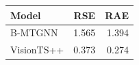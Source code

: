 \begin{tabular}{lrr}
\toprule
Model & RSE & RAE \\
\midrule
B-MTGNN & 1.565 & 1.394 \\
VisionTS++ & 0.373 & 0.274 \\
\bottomrule
\end{tabular}
